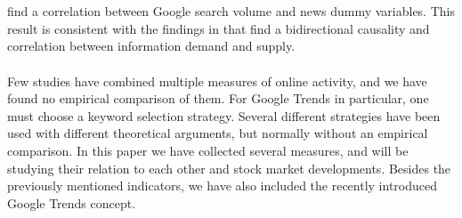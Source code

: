 \\\\
\cite{engelberg} find a correlation between Google search volume and news dummy variables. This result is consistent with the findings in \cite{vlastakis} that find a bidirectional causality and correlation between information demand and supply. 
\\\\
Few studies have combined multiple measures of online activity, and we have found no empirical comparison of them. For Google Trends in particular, one must choose a keyword selection strategy. Several different strategies have been used with different theoretical arguments, but normally without an empirical comparison. In this paper we have collected several measures, and will be studying their relation to each other and stock market developments. Besides the previously mentioned indicators, we have also included the recently introduced Google Trends concept. 
\cleardoublepage

 
